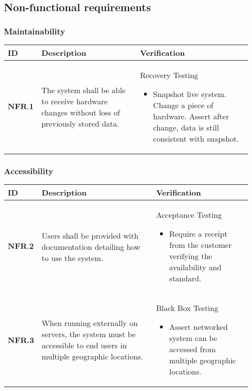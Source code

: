\subsection{Non-functional requirements}

\subsubsection{Maintainability}
\begin{longtable}[H]{|p{1.5cm}|p{4.5cm}|p{10.5cm}|}
    \hline
    \cellcolor{titleColor}\textbf{ID} & \cellcolor{titleColor}\textbf{Description} & \cellcolor{titleColor}\textbf{Verification} \\ \hline
   $ \textbf{NFR.1} $ & The system shall be able to receive hardware changes without loss of previously stored data. & Recovery Testing\begin{itemize}\item Snapshot live system. Change a piece of hardware. Assert after change, data is still consistent with snapshot.\end{itemize} \\ \hline
\end{longtable}

\subsubsection{Accessibility}
\begin{longtable}[H]{|p{1.5cm}|p{4.5cm}|p{10.5cm}|}
    \hline
    \cellcolor{titleColor}\textbf{ID} & \cellcolor{titleColor}\textbf{Description} & \cellcolor{titleColor}\textbf{Verification} \\ \hline
    $ \textbf{NFR.2} $ & Users shall be provided with documentation detailing how to use the system. & Acceptance Testing\begin{itemize}\item Require a receipt from the customer verifying the availability and standard.\end{itemize} \\ \hline
    \textbf{NFR.3} & When running externally on servers, the system must be accessible to end users in multiple geographic locations. & Black Box Testing\begin{itemize}\item Assert networked system can be accessed from multiple geographic locations.\end{itemize} \\ \hline
\end{longtable}


